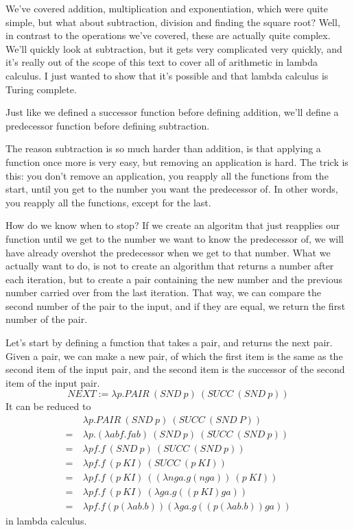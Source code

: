 \documentclass[11pt]{article}
\begin{document}
We've covered addition, multiplication and exponentiation, which were quite
simple, but what about subtraction, division and finding the square root? Well,
in contrast to the operations we've covered, these are actually quite complex.
We'll quickly look at subtraction, but it gets very complicated very quickly,
and it's really out of the scope of this text to cover all of arithmetic in
lambda calculus. I just wanted to show that it's possible and that lambda
calculus is Turing complete.


Just like we defined a successor function before defining addition, we'll
define a predecessor function before defining subtraction.


The reason subtraction is so much harder than addition, is that applying a
function once more is very easy, but removing an application is hard. The trick
is this: you don't remove an application, you reapply all the functions from
the start, until you get to the number you want the predecessor of. In other
words, you reapply all the functions, except for the last.

How do we know when to stop? If we create an algoritm that just reapplies our
function until we get to the number we want to know the predecessor of, we will
have already overshot the predecessor when we get to that number. What we
actually want to do, is not to create an algorithm that returns a number after
each iteration, but to create a pair containing the new number and the previous
number carried over from the last iteration. That way, we can compare the
second number of the pair to the input, and if they are equal, we return the
first number of the pair.

Let's start by defining a function that takes a pair, and returns the next
pair. Given a pair, we can make a new pair, of which the first item is the same
as the second item of the input pair, and the second item is the successor of
the second item of the input pair.
\[NEXT:=\lambda p.PAIR\ (SND\ p)\ (SUCC\ (SND\ p))\]
It can be reduced to
\begin{align*}
	&\lambda p.PAIR\ (SND\ p)\ (SUCC\ (SND\ P))\\
	=\ &\lambda p.(\lambda abf.fab)\ (SND\ p)\ (SUCC\ (SND\ p))\\
	=\ &\lambda pf.f\ (SND\ p)\ (SUCC\ (SND\ p))\\
	=\ &\lambda pf.f\ (p\ KI)\ (SUCC\ (p\ KI))\\
	=\ &\lambda pf.f\ (p\ KI)\ ((\lambda nga.g(nga))\ (p\ KI))\\
	=\ &\lambda pf.f\ (p\ KI)\ (\lambda ga.g((p\ KI)ga))\\
	=\ &\lambda pf.f(p(\lambda ab.b))(\lambda ga.g((p(\lambda ab.b))ga))
\end{align*}
in lambda calculus.
\end{document}
